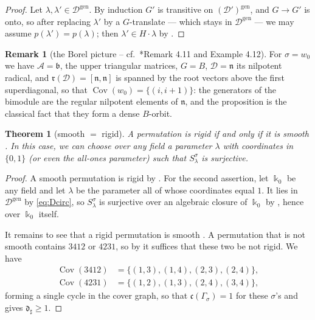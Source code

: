 \documentclass[12pt]{article}
\def\xspace{ }%
\newtheorem{theorem}{Theorem}[section]
\theoremstyle{definition}
\newtheorem{remark}[remark]{Remark}
\newcommand{\prigity}{pseudorigidity\xspace}
\newcommand{\smth}{smooth\xspace}
\newcommand{\rbm}{\mathfrak{r}}  %
\newcommand{\kk}{\Bbbk}
\newcommand{\alg}{\mathcal{A}}   %
\newcommand{\bmdl}{\mathcal{D}}   %
\newcommand{\dfr}{\mathfrak{d}}  %
\newcommand{\Sop}{S}
\newcommand{\rsub}{\sharp}       %
\newcommand{\psub}{\flat}        %
\newcommand{\gen}{\mathrm{gen}}         %
\newcommand{\wo}{w_0}                 %
\newcommand{\Cov}{\operatorname{Cov}}  %
\newcommand{\cyc}{\mathfrak{c}}            %
\newcommand{\cgr}{\Gamma}                 %
\begin{document}
\begin{proof}
Let $\lambda,\lambda' \in \bmdl^{\gen}$. By
induction $G'$ is transitive on $(\bmdl')^{\gen}$, and $G \to G'$ is
onto, so after replacing $\lambda'$ by a $G$-translate --- which stays in
$\bmdl^{\gen}$ --- we may assume $p(\lambda') = p(\lambda)$;
then $\lambda'\in H\cdot\lambda$ by
.
\end{proof}

\begin{remark}[the Borel picture -- cf.\ \cite{MR3866895}*{Remark 4.11 and Example 4.12}]\label{rem:borel}
For $\sigma = \wo$ we have $\alg = \mathfrak{b}$, the upper triangular
matrices, $G = B$, $\bmdl = \mathfrak{n}$ its nilpotent radical, and
$\rbm(\bmdl) = [\mathfrak{n},\mathfrak{n}]$ is spanned by the root
vectors above the first superdiagonal, so that $\Cov(\wo) =
\{(i,i+1)\}$: the generators of the bimodule are the regular nilpotent
elements of $\mathfrak{n}$, and the proposition is the classical fact that
they form a dense $B$-orbit.
\end{remark}

\begin{theorem}[\smth $=$ rigid]\label{thm:smoothrigid}
A permutation is rigid if and only if it is \smth.
In this case, we can choose over any field a parameter $\lambda$ with coordinates in $\{0,1\}$
(or even the all-ones parameter) such that $\Sop^\sigma_\lambda$ is surjective. 
\end{theorem}


\begin{proof}
A \smth permutation is rigid by . For the second assertion,
let $\kk_0$ be any field and let $\lambda$ be the parameter all of whose coordinates equal $1$. It lies in
$\bmdl^{\gen}$ by \eqref{eq:Dcirc}, so $\Sop^\sigma_\lambda$ is surjective over
an algebraic closure of $\kk_0$ by , hence over $\kk_0$ itself.

It remains to see that a rigid permutation is \smth. A permutation that is
not \smth contains $3412$ or $4231$, so by  it suffices
that these two be not rigid. We have
\begin{align*}
   \Cov(3412) &= \{(1,3),(1,4),(2,3),(2,4)\},\\
   \Cov(4231) &= \{(1,2),(1,3),(2,4),(3,4)\} ,
\end{align*}
forming a single cycle in the cover graph, so that $\cyc(\cgr_\sigma) = 1$ for these $\sigma$'s
and  gives $\dfr_\rsub \ge1$.
\end{proof}
\end{document}
